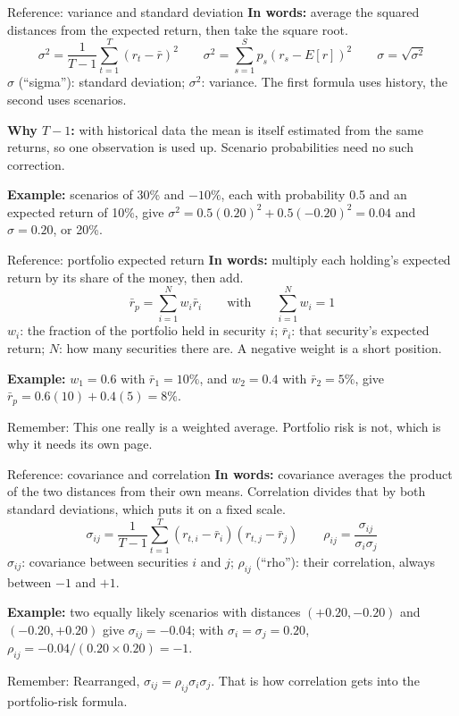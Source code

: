 \documentclass[10pt,aspectratio=169]{beamer}
\newcommand{\remember}[1]{\par\smallskip\alert{Remember:} #1}
\begin{document}
\begin{frame}[label=variance]{Reference: variance and standard deviation}
\textbf{In words:} average the squared distances from the expected return, then take the square root.
\[
\sigma^2=\frac{1}{T-1}\sum_{t=1}^{T}(r_t-\bar{r})^2\qquad
\sigma^2=\sum_{s=1}^{S}p_s(r_s-E[r])^2\qquad\sigma=\sqrt{\sigma^2}
\]
$\sigma$ (``sigma''): standard deviation; $\sigma^2$: variance. The first formula uses history, the second uses scenarios.
\par\smallskip
\textbf{Why $T-1$:} with historical data the mean is itself estimated from the same returns, so one observation is used up. Scenario probabilities need no such correction.
\par\smallskip
\textbf{Example:} scenarios of 30\% and $-10\%$, each with probability 0.5 and an expected return of 10\%, give $\sigma^2=0.5(0.20)^2+0.5(-0.20)^2=0.04$ and $\sigma=0.20$, or 20\%.
\end{frame}

\begin{frame}[label=portret]{Reference: portfolio expected return}
\textbf{In words:} multiply each holding's expected return by its share of the money, then add.
\[
\bar{r}_p=\sum_{i=1}^{N}w_i\bar{r}_i\qquad\text{with}\qquad\sum_{i=1}^{N}w_i=1
\]
$w_i$: the fraction of the portfolio held in security $i$; $\bar{r}_i$: that security's expected return; $N$: how many securities there are. A negative weight is a short position.
\par\smallskip
\textbf{Example:} $w_1=0.6$ with $\bar{r}_1=10\%$, and $w_2=0.4$ with $\bar{r}_2=5\%$, give $\bar{r}_p=0.6(10)+0.4(5)=8\%$.
\remember{This one really is a weighted average. Portfolio risk is not, which is why it needs its own page.}
\end{frame}

\begin{frame}[label=covar]{Reference: covariance and correlation}
\textbf{In words:} covariance averages the product of the two distances from their own means. Correlation divides that by both standard deviations, which puts it on a fixed scale.
\[
\sigma_{ij}=\frac{1}{T-1}\sum_{t=1}^{T}(r_{t,i}-\bar{r}_i)(r_{t,j}-\bar{r}_j)\qquad
\rho_{ij}=\frac{\sigma_{ij}}{\sigma_i\sigma_j}
\]
$\sigma_{ij}$: covariance between securities $i$ and $j$; $\rho_{ij}$ (``rho''): their correlation, always between $-1$ and $+1$.
\par\smallskip
\textbf{Example:} two equally likely scenarios with distances $(+0.20,-0.20)$ and $(-0.20,+0.20)$ give $\sigma_{ij}=-0.04$; with $\sigma_i=\sigma_j=0.20$, $\rho_{ij}=-0.04/(0.20\times0.20)=-1$.
\remember{Rearranged, $\sigma_{ij}=\rho_{ij}\sigma_i\sigma_j$. That is how correlation gets into the portfolio-risk formula.}
\end{frame}
\end{document}

